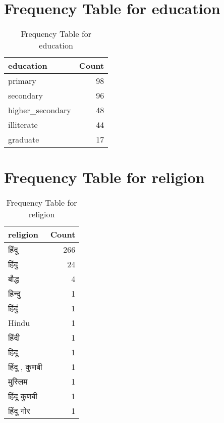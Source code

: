 \documentclass{article}
\begin{document}
\section{Frequency Table for education}
\begin{table}
\caption{Frequency Table for education}
\label{tab:education_freq}
\begin{tabular}{lr}
\toprule
education & Count \\
\midrule
primary & 98 \\
secondary & 96 \\
higher\_secondary & 48 \\
illiterate & 44 \\
graduate & 17 \\
\bottomrule
\end{tabular}
\end{table}

\section{Frequency Table for religion}
\begin{table}
\caption{Frequency Table for religion}
\label{tab:religion_freq}
\begin{tabular}{lr}
\toprule
religion & Count \\
\midrule
हिंदू & 266 \\
हिंदु & 24 \\
बौद्ध & 4 \\
हिन्दु & 1 \\
हिंदुं & 1 \\
Hindu & 1 \\
हिंदी & 1 \\
हिदू & 1 \\
हिंदू , कुणबी & 1 \\
मुस्लिम & 1 \\
हिंदू कुणबी & 1 \\
हिंदू गोर & 1 \\
\bottomrule
\end{tabular}
\end{table}
\end{document}
